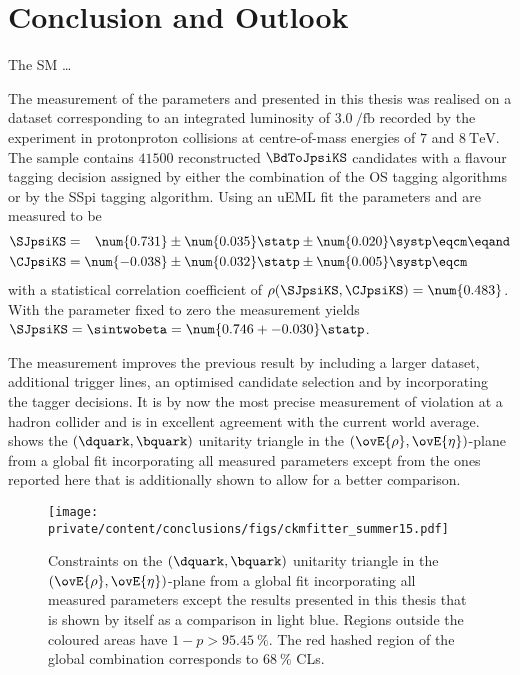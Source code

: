 
\chapter{Conclusion and Outlook}
\label{ch:conclusion}

The \acl{SM} \dots


The measurement of the \CP parameters \SJpsiKS and \CJpsiKS presented in this
thesis was realised on a dataset corresponding to an integrated luminosity of
$\SI{3.0}{\per\femto\barn}$ recorded by the \LHCb experiment in
\acl{protonproton} collisions at centre-of-mass energies of $\num{7}$ and
$\SI{8}{\TeV}$. The sample contains $\num{41500}$ reconstructed $\BdToJpsiKS$
candidates with a flavour tagging decision assigned by either the combination of
the \acl{OS} tagging algorithms or by the \acl{SSpi} tagging algorithm. Using an
\acl{uEML} fit the \CP parameters \SJpsiKS and \CJpsiKS are measured to be
%
\begin{equation*}
  \begin{split}
    \SJpsiKS &= \phantom{-}\num{0.731} \pm \num{0.035} \statp \pm \num{0.020} \systp \eqcm\eqand \\
    \CJpsiKS &=           \num{-0.038} \pm \num{0.032} \statp \pm \num{0.005} \systp \eqcm
  \end{split}
\end{equation*}
%
with a statistical correlation coefficient of $\rho(\SJpsiKS,\CJpsiKS) =
\num{0.483}$. With the parameter \CJpsiKS fixed to zero the measurement yields
$\SJpsiKS = \sintwobeta = \num{0.746 +- 0.030}\statp$.

The measurement improves the previous \LHCb result \cite{Aaij:1497268} by
including a larger dataset, additional trigger lines, an optimised candidate
selection and by incorporating the \SSpi tagger decisions. It is by now the most
precise measurement of \CP violation at a hadron collider and is in excellent
agreement with the current world average. 
shows the ${(\dquark,\bquark)}$ unitarity triangle in the
${(\ovE{\rho},\ovE{\eta})}$-plane from a global fit incorporating all measured
\CKM parameters \cite{Charles:2004jd} except from the ones reported here that is
additionally shown to allow for a better comparison.
%
\begin{figure}[ht]
\centering
\texttt{[image: private/content/conclusions/figs/ckmfitter\_summer15.pdf]}
\caption{Constraints on the ${(\dquark,\bquark)}$ unitarity triangle in the
${(\ovE{\rho},\ovE{\eta})}$-plane from a global fit incorporating all measured
\CKM parameters \cite{Charles:2004jd} except the results presented in this
thesis that is shown by itself as a comparison in light blue. Regions outside
the coloured areas have $1-p > \SI{95.45}{\percent}$. The red hashed region of
the global combination corresponds to $\SI{68}{\percent}$ \acp{CL}.}
\label{fig:conclusion:ckm_fitter_15}
\end{figure}

